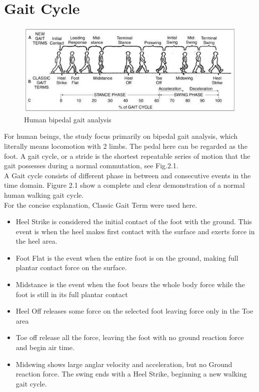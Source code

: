 \documentclass[12 pt, a4paper]{thesis}
\begin{document}
\section{Gait Cycle}
\begin{figure}[hbt!]
\begin{center}
\includegraphics[width = 150mm]{gait_cycle.jpg}
\caption{Human bipedal gait analysis \cite{gaitcycle}}
\end{center}
\end{figure}
For human beings, the study focus primarily on bipedal gait analysis, which literally means locomotion with 2 limbs. The pedal here can be regarded as the foot. A gait cycle, or a stride is the shortest repeatable series of motion that the gait possesses during a normal commutation, see Fig.2.1.\\
A Gait cycle consists of different phase in between and consecutive events in the time domain. Figure 2.1 show a complete and clear demonstration of a normal human walking gait cycle.\\
For the concise explanation, Classic Gait Term were used here.
\begin{itemize}
\item{Heel Strike is considered the initial contact of the foot with the ground. This event is when the heel makes first contact with the surface and exerts force in the heel area.}
\item{Foot Flat is the event when the entire foot is on the ground, making full plantar contact force on the surface. }
\item{Midstance is the event when the foot bears the whole body force while the foot is still in its full plantar contact}
\item{Heel Off releases some force on the selected foot leaving force only in the Toe area}
\item{Toe off release all the force, leaving the foot with no ground reaction force and begin air time.}
\item{Midswing shows large anglar velocity and acceleration, but no Ground reaction force. The swing ends with a Heel Strike, beginning a new walking gait cycle.}
\end{itemize} 
\end{document}
